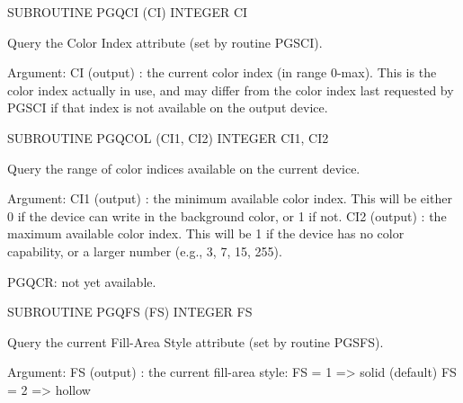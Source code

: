 {\eightpoint\begintt
      SUBROUTINE PGQCI (CI)
      INTEGER  CI
 
Query the Color Index attribute (set by routine PGSCI).
 
Argument:
 CI     (output) : the current color index (in range 0-max). This is
                   the color index actually in use, and may differ
                   from the color index last requested by PGSCI if
                   that index is not available on the output device.
\endtt}

{\eightpoint\begintt
      SUBROUTINE PGQCOL (CI1, CI2)
      INTEGER  CI1, CI2
 
Query the range of color indices available on the current device.
 
Argument:
 CI1    (output) : the minimum available color index. This will be
                   either 0 if the device can write in the
                   background color, or 1 if not.
 CI2    (output) : the maximum available color index. This will be
                   1 if the device has no color capability, or a
                   larger number (e.g., 3, 7, 15, 255).
\endtt}

{\eightpoint\begintt
PGQCR: not yet available.
\endtt}

{\eightpoint\begintt
      SUBROUTINE PGQFS (FS)
      INTEGER  FS
 
Query the current Fill-Area Style attribute (set by routine
PGSFS).
 
Argument:
 FS     (output) : the current fill-area style:
                     FS = 1 => solid (default)
                     FS = 2 => hollow
\endtt}

